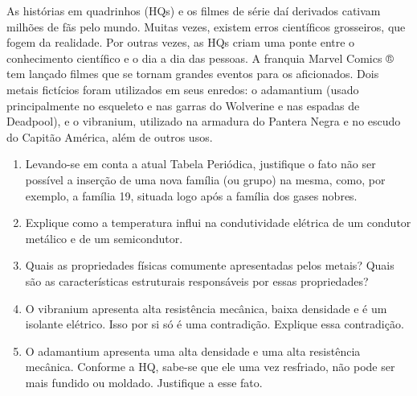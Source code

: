  As histórias em quadrinhos (HQs) e os filmes de série daí derivados cativam milhões de fãs pelo mundo. Muitas vezes, existem erros científicos grosseiros, que fogem da realidade. Por outras vezes, as HQs criam uma ponte entre o conhecimento científico e o dia a dia das pessoas. A franquia Marvel Comics ® tem lançado filmes que se tornam grandes eventos para os aficionados. Dois metais fictícios foram utilizados em seus enredos: o adamantium (usado principalmente no esqueleto e nas garras do Wolverine e nas espadas de Deadpool), e o vibranium, utilizado na armadura do Pantera Negra e no escudo do Capitão América, além de outros usos.

\begin{enumerate}[label = (\alph*)]
	\item Levando-se em conta a atual Tabela Periódica, justifique o fato não ser possível a inserção de uma nova família (ou grupo) na mesma, como, por exemplo, a família 19, situada logo após a família dos gases nobres.
	\item Explique como a temperatura influi na condutividade elétrica de um condutor metálico e de um semicondutor.
	\item Quais as propriedades físicas comumente apresentadas pelos metais? Quais são as características estruturais responsáveis por essas propriedades?
	\item O vibranium apresenta alta resistência mecânica, baixa densidade e é um isolante elétrico. Isso por si só é uma contradição. Explique essa contradição.
	\item O adamantium apresenta uma alta densidade e uma alta resistência mecânica. Conforme a HQ, sabe-se que ele uma vez resfriado, não pode ser mais fundido ou moldado. Justifique a esse fato.
\end{enumerate}